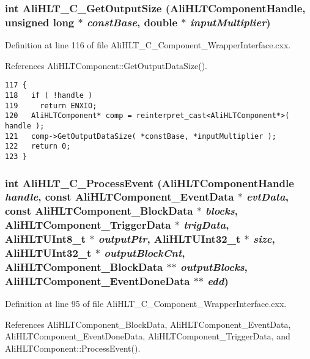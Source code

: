 \subsubsection{\setlength{\rightskip}{0pt plus 5cm}int Ali\-HLT\_\-C\_\-Get\-Output\-Size ({\bf Ali\-HLTComponent\-Handle}, unsigned long $\ast$ {\em const\-Base}, double $\ast$ {\em input\-Multiplier})}\label{group__alihlt__wrapper__interface_ga10}




Definition at line 116 of file Ali\-HLT\_\-C\_\-Component\_\-Wrapper\-Interface.cxx.

References Ali\-HLTComponent::Get\-Output\-Data\-Size().

\footnotesize\begin{verbatim}117 {
118   if ( !handle )
119     return ENXIO;
120   AliHLTComponent* comp = reinterpret_cast<AliHLTComponent*>( handle );
121   comp->GetOutputDataSize( *constBase, *inputMultiplier );
122   return 0;
123 }
\end{verbatim}\normalsize 


\subsubsection{\setlength{\rightskip}{0pt plus 5cm}int Ali\-HLT\_\-C\_\-Process\-Event ({\bf Ali\-HLTComponent\-Handle} {\em handle}, const {\bf Ali\-HLTComponent\_\-Event\-Data} $\ast$ {\em evt\-Data}, const {\bf Ali\-HLTComponent\_\-Block\-Data} $\ast$ {\em blocks}, {\bf Ali\-HLTComponent\_\-Trigger\-Data} $\ast$ {\em trig\-Data}, {\bf Ali\-HLTUInt8\_\-t} $\ast$ {\em output\-Ptr}, {\bf Ali\-HLTUInt32\_\-t} $\ast$ {\em size}, {\bf Ali\-HLTUInt32\_\-t} $\ast$ {\em output\-Block\-Cnt}, {\bf Ali\-HLTComponent\_\-Block\-Data} $\ast$$\ast$ {\em output\-Blocks}, {\bf Ali\-HLTComponent\_\-Event\-Done\-Data} $\ast$$\ast$ {\em edd})}\label{group__alihlt__wrapper__interface_ga8}




Definition at line 95 of file Ali\-HLT\_\-C\_\-Component\_\-Wrapper\-Interface.cxx.

References Ali\-HLTComponent\_\-Block\-Data, Ali\-HLTComponent\_\-Event\-Data, Ali\-HLTComponent\_\-Event\-Done\-Data, Ali\-HLTComponent\_\-Trigger\-Data, and Ali\-HLTComponent::Process\-Event().

